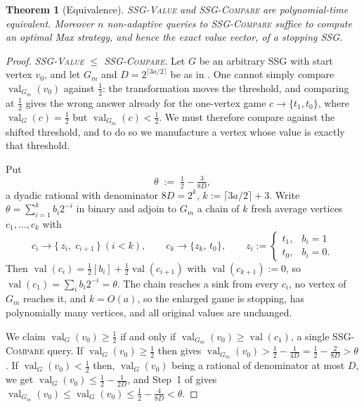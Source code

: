 \documentclass[11pt]{article}
\theoremstyle{plain}
\newtheorem{theorem}{Theorem}[section]
\theoremstyle{definition}
\DeclareMathOperator{\val}{val}
\begin{document}
\begin{theorem}[Equivalence]\label{thm:compare-equivalence}
\textsc{SSG-Value} and \textsc{SSG-Compare} are polynomial-time
equivalent. Moreover $n$ \emph{non-adaptive} queries to
\textsc{SSG-Compare} suffice to compute an optimal Max strategy, and
hence the exact value vector, of a stopping SSG.
\end{theorem}

\begin{proof}
\emph{\textsc{SSG-Value} $\le$ \textsc{SSG-Compare}.} Let $G$ be an
arbitrary SSG with start vertex $v_0$, and let $G_m$ and
$D=2^{\lceil 3a/2\rceil}$ be as in . One
cannot simply compare $\val_{G_m}(v_0)$ against $\tfrac12$: the
transformation moves the threshold, and comparing at $\tfrac12$ gives the
wrong answer already for the one-vertex game $c\to\{t_1,t_0\}$, where
$\val_G(c)=\tfrac12$ but $\val_{G_m}(c)<\tfrac12$. We must therefore
compare against the shifted threshold, and to do so we manufacture a
vertex whose value is exactly that threshold.

Put
\[
  \theta\;:=\;\tfrac12-\tfrac{3}{8D},
\]
a dyadic rational with denominator $8D=2^{k}$, $k:=\lceil 3a/2\rceil+3$.
Write $\theta=\sum_{i=1}^{k}b_i2^{-i}$ in binary and adjoin to $G_m$ a
chain of $k$ fresh average vertices $c_1,\dots,c_k$ with
\[
  c_i\to\{\,z_i,\;c_{i+1}\,\}\ (i<k),\qquad c_k\to\{z_k,\,t_0\},
  \qquad z_i:=\begin{cases}t_1,&b_i=1\\ t_0,&b_i=0.\end{cases}
\]
Then $\val(c_i)=\tfrac12 [b_i]+\tfrac12\val(c_{i+1})$ with
$\val(c_{k+1}):=0$, so $\val(c_1)=\sum_i b_i2^{-i}=\theta$. The chain
reaches a sink from every $c_i$, no vertex of $G_m$ reaches it, and $k=O(a)$,
so the enlarged game is stopping, has polynomially many vertices, and all
original values are unchanged.

We claim $\val_G(v_0)\ge\tfrac12$ if and only if
$\val_{G_m}(v_0)\ge\val(c_1)$, a single \textsc{SSG-Compare} query. If
$\val_G(v_0)\ge\tfrac12$ then  gives
$\val_{G_m}(v_0)>\tfrac12-\tfrac1{4D}=\tfrac12-\tfrac2{8D}>\theta$. If
$\val_G(v_0)<\tfrac12$ then, $\val_G(v_0)$ being a rational of
denominator at most $D$, we get $\val_G(v_0)\le\tfrac12-\tfrac1{2D}$, and
Step~1 of  gives
$\val_{G_m}(v_0)\le\val_G(v_0)\le\tfrac12-\tfrac4{8D}<\theta$.


\end{proof}
\end{document}
